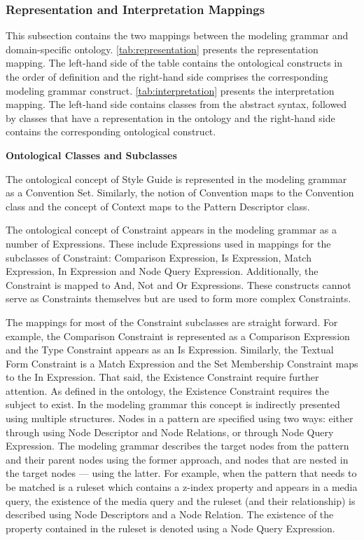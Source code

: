 \subsubsection{Representation and Interpretation Mappings} 

This subsection contains the two mappings between the modeling grammar and domain-specific ontology.
\autoref{tab:representation} presents the representation mapping. The left-hand side of the table
contains the ontological constructs in the order of definition and the right-hand side comprises the
corresponding modeling grammar construct. \autoref{tab:interpretation} presents the interpretation
mapping. The left-hand side contains classes from the abstract syntax, followed by classes that have
a representation in the ontology and the right-hand side contains the corresponding ontological
construct.




\textbf{Ontological Classes and Subclasses}

The ontological concept of Style Guide is represented in the modeling grammar
as a Convention Set. Similarly, the notion of Convention maps to the
Convention class and the concept of Context maps to the Pattern Descriptor
class.

The ontological concept of Constraint appears in the modeling grammar as a
number of Expressions. These include Expressions used in mappings for the
subclasses of Constraint: Comparison Expression, Is Expression, Match
Expression, In Expression and Node Query Expression. Additionally, the
Constraint is mapped to And, Not and Or Expressions. These constructs cannot
serve as Constraints themselves but are used to form more complex Constraints.

The mappings for most of the Constraint subclasses are straight forward. For
example, the Comparison Constraint is represented as a Comparison Expression
and the Type Constraint appears as an Is Expression. Similarly, the Textual
Form Constraint is a Match Expression and the Set Membership Constraint maps
to the In Expression. That said, the Existence Constraint require further
attention. As defined in the ontology, the Existence Constraint requires the
subject to exist. In the modeling grammar this concept is indirectly presented
using multiple structures. Nodes in a pattern are specified using two ways:
either through using Node Descriptor and Node Relations, or through Node Query
Expression. The modeling grammar describes the target nodes from the pattern
and their parent nodes using the former approach, and nodes that are nested in
the target nodes --- using the latter. For example, when the pattern that
needs to be matched is a ruleset which contains a z-index property and appears
in a media query, the existence of the media query and the ruleset (and their
relationship) is described using Node Descriptors and a Node Relation. The
existence of the property contained in the ruleset is denoted using a Node
Query Expression.

